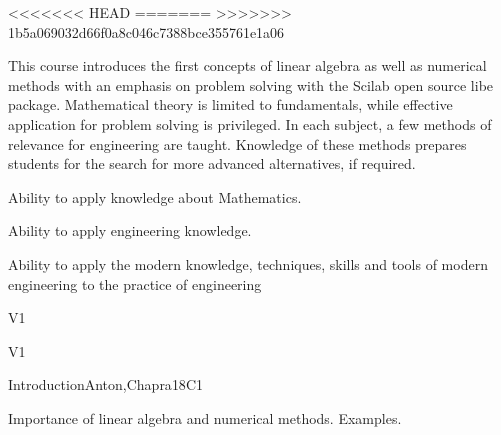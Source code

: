 \begin{syllabus}

<<<<<<< HEAD
=======
>>>>>>> 1b5a069032d66f0a8c046c7388bce355761e1a06

\begin{justification}
This course introduces the first concepts of linear algebra as well as numerical methods with an emphasis on problem solving with the Scilab open source libe package.
Mathematical theory is limited to fundamentals, while effective application for problem solving is privileged.
In each subject, a few methods of relevance for engineering are taught. Knowledge of these methods prepares students for the search for more advanced alternatives, if required.

\end{justification}

\begin{goals}
\item Ability to apply knowledge about Mathematics.
\item Ability to apply engineering knowledge.
\item Ability to apply the modern knowledge, techniques, skills and tools of modern engineering to the practice of engineering

\end{goals}

\begin{outcomes}{V1}
    \item {}
    \item {}
\end{outcomes}

\begin{competences}{V1}
    \item {} 
    \item {} 
    \item {} 
\end{competences}

\begin{unit}{Introduction}{}{Anton,Chapra}{18}{C1}

  \begin{topics}
      \item Importance of linear algebra and numerical methods. Examples.
   \end{topics}


\end{unit}
\end{syllabus}
